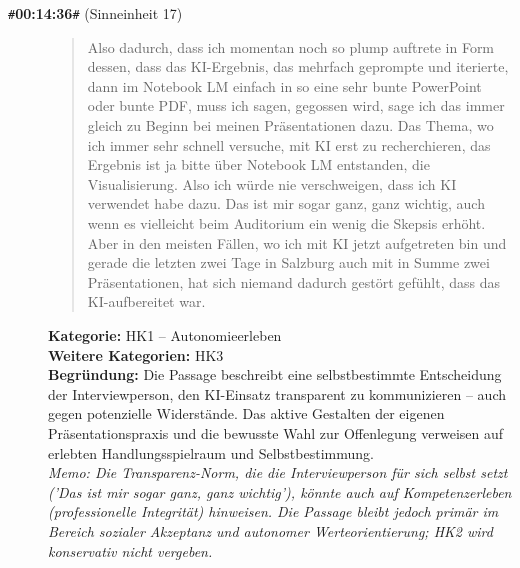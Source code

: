 \begin{description}
  \item[\texttt{\#}\textbf{00:14:36}\texttt{\#} (Sinneinheit 17)]
  \begin{quote}
  Also dadurch, dass ich momentan noch so plump auftrete in Form dessen, dass das KI-Ergebnis, das mehrfach geprompte und iterierte, dann im Notebook LM einfach in so eine sehr bunte PowerPoint oder bunte PDF, muss ich sagen, gegossen wird, sage ich das immer gleich zu Beginn bei meinen Präsentationen dazu. Das Thema, wo ich immer sehr schnell versuche, mit KI erst zu recherchieren, das Ergebnis ist ja bitte über Notebook LM entstanden, die Visualisierung. Also ich würde nie verschweigen, dass ich KI verwendet habe dazu. Das ist mir sogar ganz, ganz wichtig, auch wenn es vielleicht beim Auditorium ein wenig die Skepsis erhöht. Aber in den meisten Fällen, wo ich mit KI jetzt aufgetreten bin und gerade die letzten zwei Tage in Salzburg auch mit in Summe zwei Präsentationen, hat sich niemand dadurch gestört gefühlt, dass das KI-aufbereitet war.
  \end{quote}
  \textbf{Kategorie:} HK1 -- Autonomieerleben\\
  \textbf{Weitere Kategorien:} HK3\\
  \textbf{Begr\"undung:} Die Passage beschreibt eine selbstbestimmte Entscheidung der Interviewperson, den KI-Einsatz transparent zu kommunizieren – auch gegen potenzielle Widerstände. Das aktive Gestalten der eigenen Präsentationspraxis und die bewusste Wahl zur Offenlegung verweisen auf erlebten Handlungsspielraum und Selbstbestimmung.
  \\\textit{Memo: Die Transparenz-Norm, die die Interviewperson für sich selbst setzt ('Das ist mir sogar ganz, ganz wichtig'), könnte auch auf Kompetenzerleben (professionelle Integrität) hinweisen. Die Passage bleibt jedoch primär im Bereich sozialer Akzeptanz und autonomer Werteorientierung; HK2 wird konservativ nicht vergeben.}
\end{description}
\medskip

